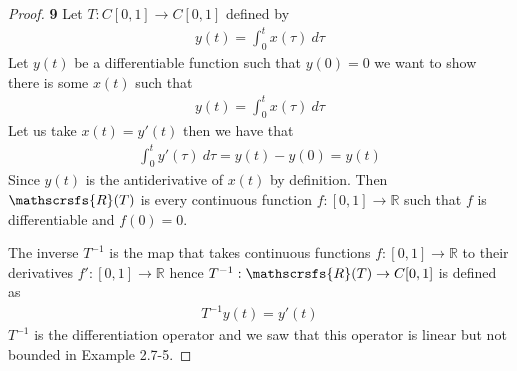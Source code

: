 \documentclass[11pt]{article}
\newcommand{\R}{\mathbb{R}}
\newcommand{\range}{\mathscrsfs{R}}
\theoremstyle{definition}
\begin{document}
\cleardoublepage
\begin{proof}{\textbf{9}}
    Let $T: C[0,1] \to C[0,1]$ defined by
    \begin{align*}
        y(t) = \int_0^t x(\tau)~d\tau
    \end{align*}
    Let $y(t)$ be a differentiable function such that $y(0) = 0$ we want to show
    there is some $x(t)$ such that
    \begin{align*}
        y(t) = \int_0^t x(\tau)~d\tau
    \end{align*}
    Let us take $x(t) = y'(t)$ then we have that
    \begin{align*}
        \int_0^t y'(\tau)~d\tau = y(t) - y(0) = y(t)
    \end{align*}
    Since $y(t)$ is the antiderivative of $x(t)$ by definition.
    Then $\range(T)$ is every continuous function $f:[0,1] \to \R$ such that
    $f$ is differentiable and $f(0) = 0$.

    The inverse $T^{-1}$ is the map that takes continuous functions
    $f:[0,1] \to \R$ to their derivatives
    $f':[0,1] \to \R$ hence $T^{-1}:\range(T) \to C[0,1]$ is defined as
    \begin{align*}
        T^{-1}y(t) = y'(t)
    \end{align*}
    $T^{-1}$ is the differentiation operator and we saw that this operator is
    linear but not bounded in Example 2.7-5.
\end{proof}
\cleardoublepage
\end{document}
